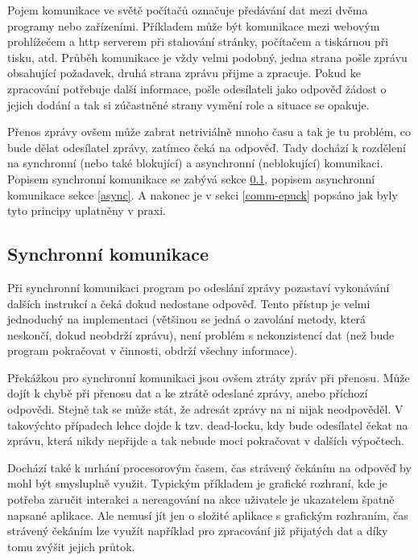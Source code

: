 \documentclass[12pt,notitlepage]{report}
\begin{document}
    Pojem komunikace ve světě počítačů označuje předávání dat mezi dvěma
    programy nebo zařízeními. Příkladem může být komunikace mezi webovým
    prohlížečem a http serverem při stahování stránky, počítačem a tiskárnou
    při tisku, atd. Průběh komunikace je vždy velmi podobný, jedna strana pošle
    zprávu obsahující požadavek, druhá strana zprávu přijme a zpracuje. Pokud
    ke zpracování potřebuje další informace, pošle odesílateli jako odpověď
    žádost o jejich dodání a tak si zúčastněné strany vymění role a situace se
    opakuje.

    Přenos zprávy ovšem může zabrat netriviálně mnoho času a tak je tu problém,
    co bude dělat odesílatel zprávy, zatímco čeká na odpověď. Tady dochází k
    rozdělení na synchronní (nebo také blokující) a asynchronní (neblokující)
    komunikaci. Popisem synchronní komunikace se zabývá sekce \ref{sync},
    popisem asynchronní komunikace sekce \ref{async}. A nakonec je v sekci
    \ref{comm-epuck} popsáno jak byly tyto principy uplatněny v praxi.

    \subsection{Synchronní komunikace}
    \label{sync}

    Při synchronní komunikaci program po odeslání zprávy pozastaví vykonávání
    dalších instrukcí a čeká dokud nedostane odpověď. Tento přístup je velmi
    jednoduchý na implementaci (většinou se jedná o zavolání metody, která
    neskončí, dokud neobdrží zprávu), není problém s nekonzistencí dat (než
    bude program pokračovat v činnosti, obdrží všechny informace).

    Překážkou pro synchronní komunikaci jsou ovšem ztráty zpráv při přenosu.
    Může dojít k chybě při přenosu dat a ke ztrátě odeslané zprávy, anebo
    příchozí odpovědi. Stejně tak se může stát, že adresát zprávy na ni nijak
    neodpověděl. V takovýchto případech lehce dojde k tzv. dead-locku, kdy bude
    odesílatel čekat na zprávu, která nikdy nepřijde a tak nebude moci
    pokračovat v dalších výpočtech.

    Dochází také k mrhání procesorovým časem, čas strávený čekáním na odpověď
    by mohl být smysluplně využit. Typickým příkladem je grafické rozhraní, kde
    je potřeba zaručit interakci a nereagování na akce uživatele je ukazatelem
    špatně napsané aplikace. Ale nemusí jít jen o složité aplikace s grafickým
    rozhraním, čas strávený čekáním lze využít například pro zpracování
    již přijatých dat a díky tomu zvýšit jejich průtok.
\end{document}

